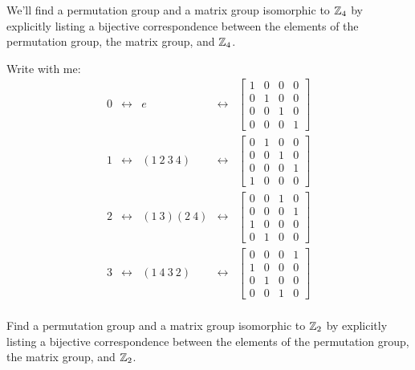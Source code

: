 \documentclass{ximera}
\begin{document}
\begin{example}
  We'll find a permutation group and a matrix group isomorphic to
  $\mathbb Z_4$ by explicitly listing a bijective correspondence between the
  elements of the permutation group, the matrix group, and $\mathbb Z_4$.

  Write with me:
  \[
  \renewcommand{\arraystretch}{2.5}
  \begin{array}{ccccc}
    0 & \leftrightarrow & e & \leftrightarrow & \left[\begin{smallmatrix} 1 & 0 & 0 & 0 \\ 0 & 1 & 0 & 0 \\ 0 & 0 & 1 & 0 \\ 0 & 0 & 0 & 1 \end{smallmatrix}\right]\\
    1 & \leftrightarrow & (1 \ 2 \ 3\ 4) & \leftrightarrow & \left[\begin{smallmatrix} 0 & 1 & 0 & 0 \\ 0 & 0 & 1 & 0 \\ 0 & 0 & 0 & 1 \\ 1 & 0 & 0 & 0 \end{smallmatrix}\right]\\
    2 & \leftrightarrow & (1 \ 3)(2\ 4) & \leftrightarrow & \left[\begin{smallmatrix} 0 & 0 & 1 & 0 \\ 0 & 0 & 0 & 1 \\ 1 & 0 & 0 & 0 \\ 0 & 1 & 0 & 0 \end{smallmatrix}\right]\\
    3 & \leftrightarrow & (1 \ 4 \ 3\ 2) & \leftrightarrow & \left[\begin{smallmatrix} 0 & 0 & 0 & 1 \\ 1 & 0 & 0 & 0 \\ 0 & 1 & 0 & 0 \\ 0 & 0 & 1 & 0 \end{smallmatrix}\right]\\
  \end{array}
  \]
\end{example}




\begin{exercise}
  Find a permutation group and a matrix group isomorphic to $\mathbb Z_2$ by
  explicitly listing a bijective correspondence between the elements
  of the permutation group, the matrix group, and $\mathbb Z_2$.
\end{exercise}
\end{document}
